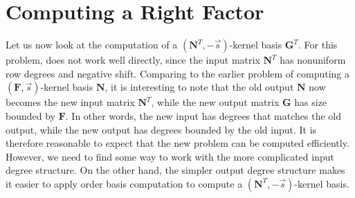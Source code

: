 \section{\label{sec:computeRightFactor}Computing a Right Factor}

Let us now look at the computation of a $\left(\mathbf{N}^{T},-\vec{s}\right)$-kernel
basis $\mathbf{G}^{T}$. For this problem, 
does not work well directly, since the input matrix $\mathbf{N}^{T}$
has nonuniform row degrees and negative shift. Comparing to the earlier
problem of computing a $\left(\mathbf{F},\vec{s}\right)$-kernel basis
$\mathbf{N}$, it is interesting to note that the old output $\mathbf{N}$
now becomes the new input matrix $\mathbf{N}^{T}$, while the new
output matrix $\mathbf{G}$ has size bounded by $\mathbf{F}$. In
other words, the new input has degrees that matches the old output,
while the new output has degrees bounded by the old input. It is
therefore reasonable to expect that the new problem can be computed
efficiently. However, we need to find some way to work with the more
complicated input degree structure. On the other hand, the simpler
output degree structure makes it easier to apply order basis computation
to compute a $\left(\mathbf{N}^{T},-\vec{s}\right)$-kernel basis. 

